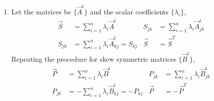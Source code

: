 \begin{enumerate}
\begin{enumerate}
\begin{align}
\begin{bNiceMatrix}[r, margin]
                            0 & 0 & 1 \\ 0 & 0 & 2 \\ -1 & -2 & 0
                        \end{bNiceMatrix}              \\
                        \vec{B} & = \begin{bNiceMatrix}[r, margin]
                                        1 & -3 & 0 \\ -3 & 1 & 0 \\ 0 & 0 & -2
                                    \end{bNiceMatrix} +
                        \begin{bNiceMatrix}[r, margin]
                            0 & 0 & 0 \\ 0 & 0 & 0 \\ 0 & 0 & 0
                        \end{bNiceMatrix}
                    \end{align}
              \item Let the matrices be $ \{\vec{A}^i\} $ and the scalar coefficients
                    $ \{\lambda_i\} $,
                    \begin{align}
                        \vec{S} & = \sum_{i=1}^{n} \lambda_i \vec{A}^i               &
                        S_{jk}  & = \sum_{i=1}^{n} \lambda_i \vec{A}^i_{jk}            \\
                        S_{jk}  & = \sum_{i=1}^{n} \lambda_i \vec{A}^i_{kj} = S_{kj} &
                        \vec{S} & = \vec{S}^T
                    \end{align}
                    Repeating the procedure for skew symmetric matrices
                    $ \{\vec{B}^i\} $,
                    \begin{align}
                        \vec{P}   & = \sum_{i=1}^{n} \lambda_i \vec{B}^i       &
                        P_{jk}    & = \sum_{i=1}^{n} \lambda_i \vec{B}^i_{jk}    \\
                        P_{jk}    & = -\sum_{i=1}^{n} \lambda_i \vec{B}^i_{kj}
                        = -P_{kj} &
                        \vec{P}   & = -\vec{P}^T
                    \end{align}


\end{enumerate}
\end{enumerate}
